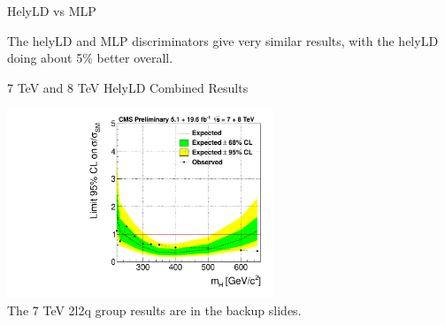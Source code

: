 \begin{frame}{HelyLD vs MLP}
\begin{center}
\end{center}
\footnotesize
The helyLD and MLP discriminators give very similar results, with the helyLD doing about 5\% better overall.  

\end{frame}




\begin{frame}{7 TeV and 8 TeV HelyLD Combined Results}
\begin{center}
\scriptsize
\includegraphics[width=0.6\textwidth]{images/limit_observed_all-btag_combi.pdf}\\
\tiny
The 7 TeV 2l2q group results are in the backup slides.
\end{center}
\end{frame}

